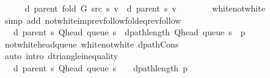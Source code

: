 \begin{isabellebody}
\ \ \ \ \isamarkupfalse%
\ {\isachardoublequoteopen}d\ {\isacharparenleft}{\kern0pt}parent\ {\isacharparenleft}{\kern0pt}fold\ G\ src\ s{\isacharparenright}{\kern0pt}{\isacharparenright}{\kern0pt}\ v\ {\isacharequal}{\kern0pt}\ d\ {\isacharparenleft}{\kern0pt}parent\ s{\isacharparenright}{\kern0pt}\ v{\isachardoublequoteclose}\isanewline
\ \ \ \ \ \ \isamarkupfalse%
\ white{\isacharunderscore}{\kern0pt}not{\isacharunderscore}{\kern0pt}white\isanewline
\ \ \ \ \ \ \isamarkupfalse%
\ {\isacharparenleft}{\kern0pt}simp\ add{\isacharcolon}{\kern0pt}\ not{\isacharunderscore}{\kern0pt}white{\isacharunderscore}{\kern0pt}imp{\isacharunderscore}{\kern0pt}rev{\isacharunderscore}{\kern0pt}follow{\isacharunderscore}{\kern0pt}fold{\isacharunderscore}{\kern0pt}eq{\isacharunderscore}{\kern0pt}rev{\isacharunderscore}{\kern0pt}follow{\isacharparenright}{\kern0pt}\isanewline
\ \ \ \ \isamarkupfalse%
\ \isamarkupfalse%
\ {\isachardoublequoteopen}{\isachardot}{\kern0pt}{\isachardot}{\kern0pt}{\isachardot}{\kern0pt}\ {\isasymle}\ d\ {\isacharparenleft}{\kern0pt}parent\ s{\isacharparenright}{\kern0pt}\ {\isacharparenleft}{\kern0pt}Q{\isacharunderscore}{\kern0pt}head\ {\isacharparenleft}{\kern0pt}queue\ s{\isacharparenright}{\kern0pt}{\isacharparenright}{\kern0pt}\ {\isacharplus}{\kern0pt}\ dpath{\isacharunderscore}{\kern0pt}length\ {\isacharparenleft}{\kern0pt}Q{\isacharunderscore}{\kern0pt}head\ {\isacharparenleft}{\kern0pt}queue\ s{\isacharparenright}{\kern0pt}\ {\isacharhash}{\kern0pt}\ p{\isacharparenright}{\kern0pt}{\isachardoublequoteclose}\isanewline
\ \ \ \ \ \ \isamarkupfalse%
\ not{\isacharunderscore}{\kern0pt}white{\isacharunderscore}{\kern0pt}head{\isacharunderscore}{\kern0pt}queue\ white{\isacharunderscore}{\kern0pt}not{\isacharunderscore}{\kern0pt}white\ dpath{\isacharunderscore}{\kern0pt}Cons\isanewline
\ \ \ \ \ \ \isamarkupfalse%
\ {\isacharparenleft}{\kern0pt}auto\ intro{\isacharcolon}{\kern0pt}\ d{\isacharunderscore}{\kern0pt}triangle{\isacharunderscore}{\kern0pt}inequality{\isacharparenright}{\kern0pt}\isanewline
\ \ \ \ \isamarkupfalse%
\ \isamarkupfalse%
\ {\isachardoublequoteopen}{\isachardot}{\kern0pt}{\isachardot}{\kern0pt}{\isachardot}{\kern0pt}\ {\isacharequal}{\kern0pt}\ d\ {\isacharparenleft}{\kern0pt}parent\ s{\isacharparenright}{\kern0pt}\ {\isacharparenleft}{\kern0pt}Q{\isacharunderscore}{\kern0pt}head\ {\isacharparenleft}{\kern0pt}queue\ s{\isacharparenright}{\kern0pt}{\isacharparenright}{\kern0pt}\ {\isacharplus}{\kern0pt}\ {}\ {\isacharplus}{\kern0pt}\ dpath{\isacharunderscore}{\kern0pt}length\ p{\isachardoublequoteclose}\isanewline

\end{isabellebody}
